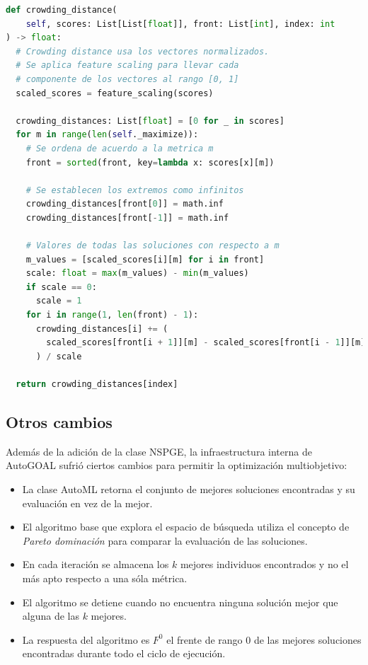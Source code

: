 \begin{lstlisting}[caption=Crowding Distance Sorting, language=Python]
def crowding_distance(
    self, scores: List[List[float]], front: List[int], index: int
) -> float:
  # Crowding distance usa los vectores normalizados.
  # Se aplica feature scaling para llevar cada
  # componente de los vectores al rango [0, 1]
  scaled_scores = feature_scaling(scores)

  crowding_distances: List[float] = [0 for _ in scores]
  for m in range(len(self._maximize)):
    # Se ordena de acuerdo a la metrica m
    front = sorted(front, key=lambda x: scores[x][m])

    # Se establecen los extremos como infinitos
    crowding_distances[front[0]] = math.inf
    crowding_distances[front[-1]] = math.inf

    # Valores de todas las soluciones con respecto a m 
    m_values = [scaled_scores[i][m] for i in front]
    scale: float = max(m_values) - min(m_values)
    if scale == 0:
      scale = 1
    for i in range(1, len(front) - 1):
      crowding_distances[i] += (
        scaled_scores[front[i + 1]][m] - scaled_scores[front[i - 1]][m]
      ) / scale

  return crowding_distances[index]
\end{lstlisting}

\subsection{Otros cambios}
Adem\'as de la adici\'on de la clase NSPGE, la infraestructura interna de AutoGOAL sufri\'o ciertos cambios para permitir la optimizaci\'on multiobjetivo:
\begin{itemize}
    \item La clase AutoML retorna el conjunto de mejores soluciones encontradas y su evaluaci\'on en vez de la mejor.
    \item El algoritmo base que explora el espacio de b\'usqueda utiliza el concepto de \textit{Pareto dominaci\'on} para comparar la evaluaci\'on de las soluciones.
    \item En cada  iteraci\'on se almacena los $k$ mejores individuos encontrados y no el m\'as apto respecto a una s\'ola m\'etrica.
    \item El algoritmo se detiene cuando no encuentra ninguna soluci\'on mejor que alguna de las $k$ mejores.
    \item La respuesta del algoritmo es $F^0$ el frente de rango $0$ de las mejores soluciones encontradas durante todo el ciclo de ejecuci\'on.
\end{itemize}

